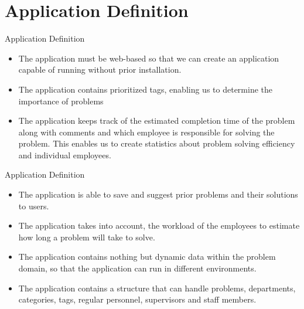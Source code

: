 \section*{Application Definition}
\begin{frame}{Application Definition}
\begin{itemize}
\item The application must be web-based so that we can create an application capable of running without prior installation.
\item The application contains prioritized tags, enabling us to determine the importance of problems
\item The application keeps track of the estimated completion time of the problem along with comments and which employee is responsible for solving the problem.
This enables us to create statistics about problem solving efficiency and individual employees.
\end{itemize}
\end{frame}

\begin{frame}{Application Definition}
\begin{itemize}
\item The application is able to save and suggest prior problems and their solutions to users.
\item The application takes into account, the workload of the employees to estimate how long a problem will take to solve.
\item The application contains nothing but dynamic data within the problem domain, so that the application can run in different environments.
\item The application contains a structure that can handle problems, departments, categories, tags, regular personnel, supervisors and staff members.
\end{itemize}
\end{frame}